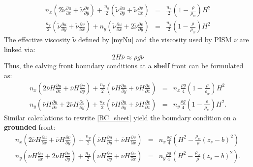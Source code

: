 \documentclass[a4paper,10pt]{article}
\begin{document}
\begin{eqnarray*}
n_x\left(2\tilde{\nu}\frac{\partial u}{\partial x}+\tilde{\nu}\frac{\partial v}{\partial y}  \right) + \frac{n_y}{2} \left(\tilde{\nu}\frac{\partial u}{\partial y} + \tilde{\nu}\frac{\partial v}{\partial x} \right) & =  & \frac{n_x}{2}\left(1-\frac{\rho}{\rho_w}\right)H^2\\  
\frac{n_x}{2} \left(\tilde{\nu}\frac{\partial u}{\partial y} + \tilde{\nu}\frac{\partial v}{\partial x} \right) + n_y\left(\tilde{\nu}\frac{\partial u}{\partial x}+2\tilde{\nu}\frac{\partial v}{\partial y}  \right) & = & \frac{n_y}{2}\left(1-\frac{\rho}{\rho_w}\right)H^2 
\end{eqnarray*}
The effective viscosity $\tilde{\nu}$ defined by \eqref{myNu} and the viscosity used by PISM $\overline{\nu}$ are linked via:
\begin{equation*}%
2H\overline\nu\approx\rho g\tilde{\nu}
\label{nuLink}
\end{equation*}
Thus, the calving front boundary conditions at a \textbf{shelf} front can be formulated as:
\begin{eqnarray}%
n_x\left(2\overline{\nu}H\frac{\partial u}{\partial x}+\overline{\nu}H\frac{\partial v}{\partial y}  \right) + \frac{n_y}{2} \left(\overline{\nu}H\frac{\partial u}{\partial y} + \overline{\nu}H\frac{\partial v}{\partial x} \right) & =  & n_x\frac{\rho g}{4}\left(1-\frac{\rho}{\rho_w}\right)H^2 \label{calv_BC1}\\  
 n_y\left(\overline{\nu}H\frac{\partial u}{\partial x}+2\overline{\nu}H\frac{\partial v}{\partial y}  \right) + \frac{n_x}{2} \left(\overline{\nu}H\frac{\partial u}{\partial y} + \overline{\nu}H\frac{\partial v}{\partial x} \right) & = & n_y\frac{\rho g}{4}\left(1-\frac{\rho}{\rho_w}\right)H^2 . \label{calv_BC2}
\end{eqnarray}
Similar calculations to rewrite \eqref{BC_sheet} yield the boundary condition on a \textbf{grounded} front:
\begin{eqnarray}%
n_x\left(2\overline{\nu}H\frac{\partial u}{\partial x}+\overline{\nu}H\frac{\partial v}{\partial y}  \right) + \frac{n_y}{2} \left(\overline{\nu}H\frac{\partial u}{\partial y} + \overline{\nu}H\frac{\partial v}{\partial x} \right) & =  & n_x\frac{\rho g}{4}\left(H^2-\frac{\rho_w}{\rho}( z_s-b)^2  \right) \label{sheet_BC1}\\  
 n_y\left(\overline{\nu}H\frac{\partial u}{\partial x}+2\overline{\nu}H\frac{\partial v}{\partial y}  \right) + \frac{n_x}{2} \left(\overline{\nu}H\frac{\partial u}{\partial y} + \overline{\nu}H\frac{\partial v}{\partial x} \right) & = & n_y\frac{\rho g}{4}\left(H^2-\frac{\rho_w}{\rho}(z_s - b)^2 \right). \label{sheet_BC2}
\end{eqnarray}
\end{document}

